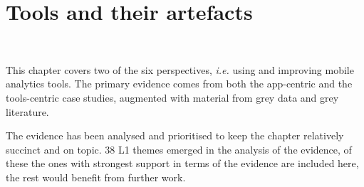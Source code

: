 \chapter{Tools and their artefacts}~\label{chapter-tools-and-their-artefacts}

This chapter covers two of the six perspectives, \emph{i.e.} using and improving mobile analytics tools. The primary evidence comes from both the app-centric and the tools-centric case studies, augmented with material from grey data and grey literature.

The evidence has been analysed and prioritised to keep the chapter relatively succinct and on topic. 38 L1 themes emerged in the analysis of the evidence, of these the ones with strongest support in terms of the evidence are included here, the rest would benefit from further work.

